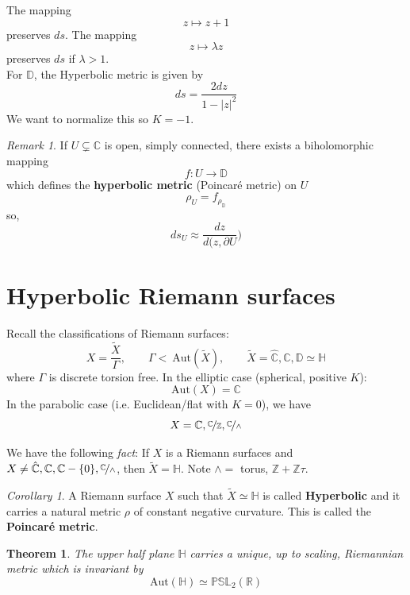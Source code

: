 \documentclass[a4paper, 11pt]{book}
\newtheorem{theorem}{Theorem}
\theoremstyle{definition}
\theoremstyle{remark}
\newtheorem*{remark}{Remark}
\newtheorem{corollary}{Corollary}[theorem]
\begin{document}
    The mapping
    \[ z\mapsto z+1 \]
    preserves $ds$. The mapping
    \[ z\mapsto \lambda z \]
    preserves $ds$ if $\lambda>1$.\\

    For $\mathbb{D}$, the Hyperbolic metric is given by
    \[ ds = \frac{2dz}{1-|z|^2} \]
    We want to normalize this so $K=-1$.

    \begin{remark}
        If $U\subsetneq \mathbb{C}$ is open, simply connected, there exists a biholomorphic mapping
        \[ f: U\to \mathbb{D} \]
        which defines the \textbf{hyperbolic metric} (Poincaré metric) on $U$
        \[ \rho_U = f_{\rho_\mathbb{D}} \]
        so,
        \[ ds_U \approx \frac{dz}{d(z,\partial U}) \]
    \end{remark}

    \section{Hyperbolic Riemann surfaces}

    Recall the classifications of Riemann surfaces:
    \[ X = \frac{\widetilde{X}}{\Gamma},\qquad \Gamma <\:\text{Aut}(\widetilde{X}),\qquad \widetilde{X} = \hat{\mathbb{C}},\mathbb{C},
        \mathbb{D}\simeq \mathbb{H} \]
    where $\Gamma$ is discrete torsion free. In the elliptic case (spherical, positive $K$):
    \[ \text{Aut}(X) = \mathbb{C} \]
    In the parabolic case (i.e. Euclidean/flat with $K=0$), we have
    \[ X = \mathbb{C},\nicefrac{\mathbb{C}}{\mathbb{Z}},\nicefrac{\mathbb{C}}{\wedge} \]

    We have the following \textit{fact}: If $X$ is a Riemann surfaces and $X\neq\hat{\mathbb{C}},\mathbb{C},\mathbb{C}-\{0\},
    \nicefrac{\mathbb{C}}{\wedge}$, then $\widetilde{X} = \mathbb{H}$. Note $\wedge =$ torus, $\mathbb{Z} + \mathbb{Z}\tau$.\\

    \begin{corollary}
        A Riemann surface $X$ such that $\widetilde{X} \simeq \mathbb{H}$ is called \textbf{Hyperbolic} and it carries a natural
        metric $\rho$ of constant negative curvature. This is called the \textbf{Poincaré metric}.
    \end{corollary}

    \begin{theorem}
        The upper half plane $\mathbb{H}$ carries a unique, up to scaling, Riemannian metric which is invariant by
        \[ \text{Aut}(\mathbb{H}) \simeq \mathbb{PSL}_2(\mathbb{R}) \]
    \end{theorem}
\end{document}
